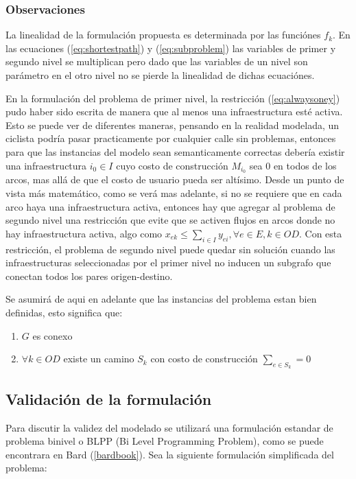 \documentclass{article}
\begin{document}
  \subsubsection*{Observaciones}

  La linealidad de la formulación propuesta es determinada por las funciónes $f_k$. En las ecuaciones (\ref{eq:shortestpath}) y (\ref{eq:subproblem}) las variables de primer y segundo nivel se multiplican pero dado que las variables de un nivel son parámetro en el otro nivel no se pierde la linealidad de dichas ecuaciónes.

  En la formulación del problema de primer nivel, la restricción (\ref{eq:alwaysoney}) pudo haber sido escrita de manera que al menos una infraestructura esté activa. Esto se puede ver de diferentes maneras, pensando en la realidad modelada, un ciclista podría pasar practicamente por cualquier calle sin problemas, entonces para que las instancias del modelo sean semanticamente correctas debería existir una infraestructura $i_0 \in I$ cuyo costo de construcción $M_{i_0}$ sea 0 en todos de los arcos, mas allá de que el costo de usuario pueda ser altísimo. Desde un punto de vista más matemático, como se verá mas adelante, si no se requiere que en cada arco haya una infraestructura activa, entonces hay que agregar al problema de segundo nivel una restricción que evite que se activen flujos en arcos donde no hay infraestructura activa, algo como $x_{ek} \leq \sum_{i \in I} y_{ei}, \forall e \in E, k \in OD$. Con esta restricción, el problema de segundo nivel puede quedar sin solución cuando las infraestructuras seleccionadas por el primer nivel no inducen un subgrafo que conectan todos los pares origen-destino.

  Se asumirá de aqui en adelante que las instancias del problema estan bien definidas, esto significa que:

  \begin{enumerate}
    \item {$G$ es conexo}
    \item {$\forall k \in OD$ existe un camino $S_k$ con costo de construcción $\sum_{e \in S_k} = 0$}
  \end{enumerate}

  \subsection*{Validación de la formulación}

  Para discutir la validez del modelado se utilizará una formulación estandar de problema binivel o BLPP (Bi Level Programming Problem), como se puede encontrara en Bard (\ref{bardbook}).
  Sea la siguiente formulación simplificada del problema:
\end{document}
